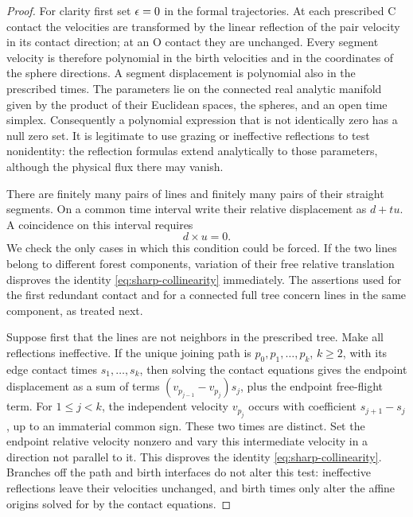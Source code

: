 \begin{proof}
For clarity first set \(\epsilon=0\) in the formal trajectories.  At
each prescribed C contact the velocities are transformed by the
linear reflection of the pair velocity in its contact direction;
at an O contact they are unchanged.  Every segment velocity is
therefore polynomial in the birth velocities and in the coordinates
of the sphere directions.  A segment displacement is polynomial
also in the prescribed times.  The parameters lie on the connected
real analytic manifold given by the product of their Euclidean
spaces, the spheres, and an open time simplex.  Consequently a
polynomial expression that is not identically zero has a null zero
set.  It is legitimate to use grazing or ineffective reflections
to test nonidentity: the reflection formulas extend analytically
to those parameters, although the physical flux there may vanish.

There are finitely many pairs of lines and finitely many pairs of
their straight segments.  On a common time interval write their
relative displacement as \(d+tu\).  A coincidence on this interval
requires
\begin{equation}\label{eq:sharp-collinearity}
                             d\times u=0.
\end{equation}
We check the only cases in which this condition could be forced.
If the two lines belong to different forest components, variation
of their free relative translation disproves the identity
\eqref{eq:sharp-collinearity} immediately.  The assertions used for
the first redundant contact and for a connected full tree concern
lines in the same component, as treated next.

Suppose first that the lines are not neighbors in the prescribed
tree.  Make all reflections ineffective.  If the unique joining
path is \(p_0,p_1,\ldots,p_k\), \(k\ge2\), with its edge contact
times \(s_1,\ldots,s_k\), then solving the contact equations gives
the endpoint displacement as a sum of terms
\((v_{p_{j-1}}-v_{p_j})s_j\), plus the endpoint free-flight term.
For \(1\le j<k\), the independent velocity \(v_{p_j}\) occurs
with coefficient \(s_{j+1}-s_j\), up to an immaterial common sign.
These two times are distinct.  Set the endpoint relative velocity
nonzero and vary this intermediate velocity in a direction not
parallel to it.  This disproves the identity
\eqref{eq:sharp-collinearity}.  Branches off the path and birth
interfaces do not alter this test: ineffective reflections leave
their velocities unchanged, and birth times only alter the affine
origins solved for by the contact equations.


\end{proof}
